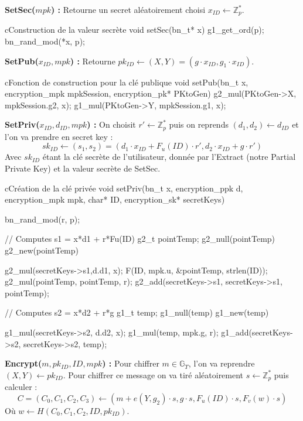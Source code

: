 \textbf{SetSec($mpk$) :} Retourne un secret aléatoirement choisi $x_{ID} \leftarrow \mathbb{Z}_p^*$.

\begin{sourcebox}{c}{Construction de la valeur secrète}
	void setSec(bn_t* x){
		g1_get_ord(p);
		bn_rand_mod(*x, p);
	}
\end{sourcebox}

\textbf{SetPub($x_{ID}, mpk$) :} Retourne $pk_{ID} \leftarrow (X,Y) = (g \cdot x_{ID}, g_1 \cdot x_{ID})$.

\begin{sourcebox}{c}{Fonction de construction pour la clé publique}
	void setPub(bn_t x, encryption_mpk mpkSession, encryption_pk* PKtoGen){
		g2_mul(PKtoGen->X, mpkSession.g2, x);
		g1_mul(PKtoGen->Y, mpkSession.g1, x);
	}
\end{sourcebox}

\textbf{SetPriv($x_{ID}, d_{ID}, mpk$) :} On choisit $r' \leftarrow \mathbb{Z}_p^*$ puis on reprends $(d_1, d_2) \leftarrow d_{ID}$ et l'on va prendre en secret key : 
\[sk_{ID} \leftarrow (s_1, s_2) = (d_1 \cdot x_{ID} + F_u(ID) \cdot r', d_2 \cdot x_{ID} + g \cdot r')\]
Avec $sk_{ID}$ étant la clé secrète de l'utilisateur, donnée par l'Extract (notre Partial Private Key) et la valeur secrète de SetSec.

\begin{sourcebox}{c}{Création de la clé privée}
	void setPriv(bn_t x, encryption_ppk d, encryption_mpk mpk, char* ID, encryption_sk* secretKeys){
		bn_rand_mod(r, p);
		
		// Computes s1 = x*d1 + r*Fu(ID)
		g2_t pointTemp;
		g2_null(pointTemp)
		g2_new(pointTemp)
		
		g2_mul(secretKeys->s1,d.d1, x);
		F(ID, mpk.u, &pointTemp, strlen(ID));
		g2_mul(pointTemp, pointTemp, r);
		g2_add(secretKeys->s1, secretKeys->s1, pointTemp);
		
		// Computes s2 = x*d2 + r*g
		g1_t temp;
		g1_null(temp)
		g1_new(temp)
		
		g1_mul(secretKeys->s2, d.d2, x);
		g1_mul(temp, mpk.g, r);
		g1_add(secretKeys->s2, secretKeys->s2, temp);
	}
\end{sourcebox}

\textbf{Encrypt($m, pk_{ID}, ID, mpk$) :} Pour chiffrer $m \in \mathbb{G}_T$, l'on va reprendre $(X,Y) \leftarrow pk_{ID}$. Pour chiffrer ce message on va tiré aléatoirement $s \leftarrow \mathbb{Z}_p^*$ puis calculer : 
\[C = (C_0, C_1, C_2, C_3) \leftarrow (m + e(Y, g_2) \cdot s, g \cdot s,F_u(ID) \cdot s, F_v(w) \cdot s )\]
Où $w \leftarrow H(C_0,C_1, C_2, ID, pk_{ID})$.

